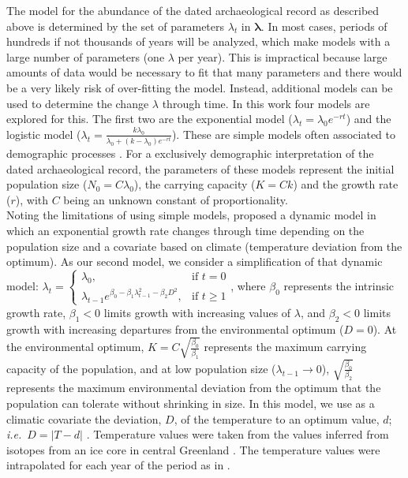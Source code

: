 \documentclass[a4paper]{article}
\begin{document}
The model for the abundance of the dated archaeological record as described above is determined by the set of parameters $\lambda_t$ in $\bm{\lambda}$. In most cases, periods of hundreds if not thousands of years will be analyzed, which make models with a large number of parameters (one $\lambda$ per year). This is impractical because large amounts of data would be necessary to fit that many parameters and there would be a very likely risk of over-fitting the model. Instead, additional models can be used to determine the change $\lambda$ through time. In this work four models are explored for this. The first two are the exponential model ($\lambda_t = \lambda_0 e^{-rt}$) and the logistic model ($\lambda_t = \frac{k\lambda_0}{\lambda_0+(k-\lambda_0)e^{-rt}}$). These are simple models often associated to demographic processes \parencite[\emph{e.g.}][]{Bevan2017a}. For a exclusively demographic interpretation of the dated archaeological record, the parameters of these models represent the initial population size ($N_0 = C \lambda_0$), the carrying capacity ($K = C k$) and the growth rate ($r$), with $C$ being an unknown constant of proportionality.
\\

Noting the limitations of using simple models, \textcite{Brown2017} proposed a dynamic model in which an exponential growth rate changes through time depending on the population size and a covariate based on climate (temperature deviation from the optimum). As our second model, we consider a simplification of that dynamic model:
$\lambda_t = \left\{
    \begin{array}{lr}
        \lambda_0, & \text{if } t=0\\
        \lambda_{t-1} e^{\beta_0 - \beta_1\lambda_{t-1}^2 - \beta_2D^2}, & \text{if } t\geq 1
    \end{array}\right.$, where $\beta_0$ represents the intrinsic growth rate, $\beta_1<0$ limits growth with increasing values of $\lambda$, and $\beta_2<0$ limits growth with increasing departures from the environmental optimum ($D=0$). At the environmental optimum, $K=C\sqrt{\frac{\beta_0}{\beta_1}}$ represents the maximum carrying capacity of the population, and at low population size ($\lambda_{t-1} \rightarrow 0$), $\sqrt{\frac{\beta_0}{\beta_2}}$ represents the maximum environmental deviation from the optimum that the population can tolerate without shrinking in size. In this model, we use as a climatic covariate the deviation, $D$, of the temperature to an optimum value, $d$; \emph{i.e.}\ $D=|T-d|$ \parencite[][considered $d$ to be the average temperature of the period]{Brown2017}. Temperature values were taken from the values inferred from isotopes from an ice core in central Greenland \parencite{Alley2000,Alley2004}. The temperature values were intrapolated for each year of the period as in \textcite{Brown2017}.
\\
\end{document}
